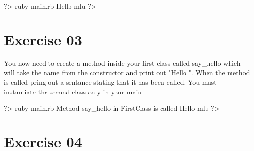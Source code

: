 \documentclass{42-en}
\begin{document}
\begin{42console}
	?> ruby main.rb
	Hello mlu
	?>
\end{42console}

\nextexercice
\chapter{Exercise 03}


\makeheaderfiles

You now need to create a method inside your first class called say\_hello which will take the name from the constructor and print out "Hello ". When the method is called pring out a sentance stating that it has been called. You must instantiate the second class only in your main.

\begin{42console}
	?> ruby main.rb
	Method say_hello in FirstClass is called
	Hello mlu
	?>
\end{42console}

\nextexercice
\chapter{Exercise 04}


\makeheaderfiles
\end{document}
